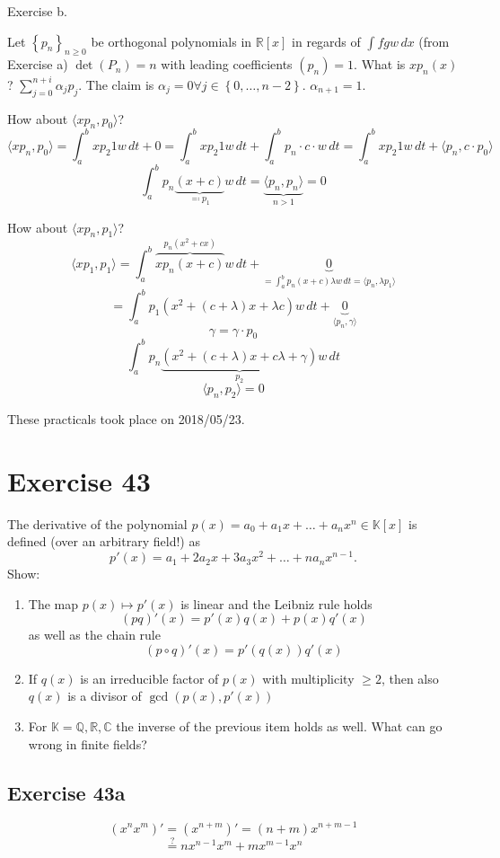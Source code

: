 \documentclass[a4paper]{article}
\theoremstyle{definition}
\newcommand\dateref[1]{These practicals took place on #1.\par}
\newcommand\set[1]{\left\{#1\right\}}
\newcommand\ip[2]{\langle{#1},{#2}\rangle}
\begin{document}
Exercise b.

Let $\set{p_n}_{n\geq 0}$ be orthogonal polynomials in $\mathbb R[x]$ in regards of $\int fgw \, dx$ (from Exercise a)
$\det(P_n) = n$ with leading coefficients $(p_n) = 1$.
What is $xp_n(x)$? $\sum_{j=0}^{n+i} \alpha_j p_j$.
The claim is $\alpha_j = 0 \forall j \in \set{0,\dots, n-2}$. $\alpha_{n+1} = 1$.

How about $\ip{xp_n}{p_0}$?
\[ \ip{xp_n}{p_0} = \int_{a}^b xp_2 1 w \, dt + 0 = \int_{a}^b xp_2 1 w \, dt + \int_{a}^b p_n \cdot c \cdot w \, dt = \int_{a}^b xp_2 1 w \, dt + \ip{p_n}{c \cdot p_0} \]
\[ \int_a^b p_n\underbrace{(x + c)}_{\eqqcolon p_1} w \,dt = \underbrace{\ip{p_n}{p_n}}_{n > 1} = 0 \]

How about $\ip{xp_n}{p_1}$?
\[ \ip{xp_1}{p_1} = \int_a^b \overbrace{x p_n (x + c)}^{p_n (x^2 + cx)} w \, dt + \underbrace{0}_{= \int_a^b p_n(x + c) \lambda w \, dt = \ip{p_n}{\lambda p_1}} \]
\[ = \int_a^b p_1(x^2 + (c + \lambda) x + \lambda c) w \, dt + \underbrace{0}_{\ip{p_n}{\gamma}} \]
\[ \gamma = \gamma \cdot p_0 \]
\[ \int_a^b p_n \underbrace{\left(x^2 + (c + \lambda) x + c \lambda + \gamma\right)}_{p_2} w \, dt \]
\[ \ip{p_n}{p_2} = 0 \]

\dateref{2018/05/23}

\section*{Exercise 43}
\begin{ex}
  The derivative of the polynomial $p(x) = a_0 + a_1x + \dots + a_n x^n \in \mathbb K[x]$ is defined (over an arbitrary field!) as
  \[ p'(x) = a_1 + 2a_2 x + 3a_3 x^2 + \dots + na_n x^{n-1}. \]
  Show:
  \begin{enumerate}
    \item The map $p(x) \mapsto p'(x)$ is linear and the Leibniz rule holds
      \[ (pq)'(x) = p'(x) q(x) + p(x) q'(x) \]
      as well as the chain rule
      \[ (p \circ q)'(x) = p'(q(x)) q'(x) \]
    \item If $q(x)$ is an irreducible factor of $p(x)$ with multiplicity $\geq 2$, then also $q(x)$ is a divisor of $\operatorname{gcd}(p(x), p'(x))$
    \item For $\mathbb K = \mathbb Q, \mathbb R, \mathbb C$ the inverse of the previous item holds as well. What can go wrong in finite fields?
  \end{enumerate}
\end{ex}

\subsection{Exercise 43a}
\[ (x^n x^m)' = (x^{n + m})' = (n + m) x^{n + m-1} \]
\[ \overset{\text{?}}= n x^{n-1} x^m + m x^{m-1} x^n \]
\end{document}
